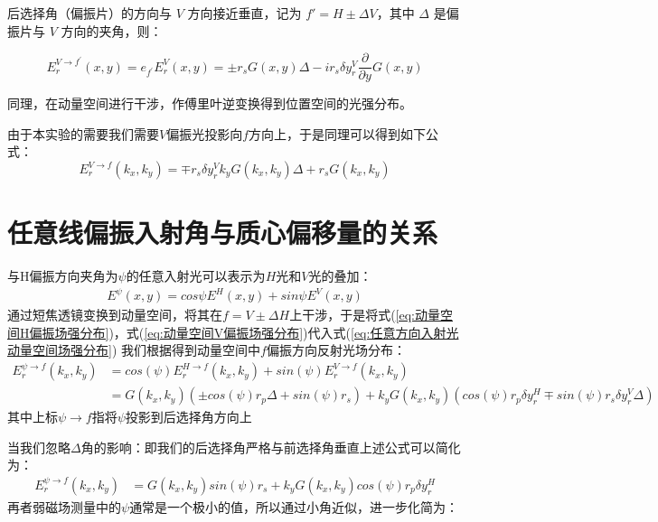 \documentclass[12pt]{ctexart}
\numberwithin{equation}{section} %
\begin{document}
      
        后选择角（偏振片）的方向与 $V$ 方向接近垂直，记为 $f' = H \pm \Delta V$，其中 $\Delta$ 是偏振片与 $V$ 方向的夹角，则：

        \begin{equation*}
        E_{r}^{V \to f^{'}}(x,y) = e_{f^{'}} E_{r}^{V}(x,y) = \pm r_{s} G(x,y) \Delta -i r_{s} \delta y_{r}^{V} \frac{\partial}{\partial y} G(x,y)  
        \end{equation*}
        
        同理，在动量空间进行干涉，作傅里叶逆变换得到位置空间的光强分布。

        由于本实验的需要我们需要$V$偏振光投影向$f$方向上，于是同理可以得到如下公式：
\begin{equation}
    E_{r}^{V \to f}(k_x,k_y)=\mp r_{s} \delta y_{r}^{V}  k_y G\left(k_x, k_y\right)\Delta+r_sG(k_x,k_y)
\label{eq:动量空间V偏振场强分布}
\end{equation}

\section{任意线偏振入射角与质心偏移量的关系}
与H偏振方向夹角为$\psi$的任意入射光可以表示为$H$光和$V$光的叠加：
\begin{align*}E^{\psi}(x,y)=cos\psi E^H(x,y)+sin\psi E^V(x,y)\end{align*}
通过短焦透镜变换到动量空间，将其在$f=V \pm \Delta H $上干涉，于是将式(\ref{eq:动量空间H偏振场强分布})，式(\ref{eq:动量空间V偏振场强分布})代入式(\ref{eq:任意方向入射光动量空间场强分布})
我们根据得到动量空间中$f$偏振方向反射光场分布：
\begin{align}
    E_r^{\psi \to f}(k_x,k_y) &=cos(\psi)E_r^{H \to f}(k_x,k_y)+sin(\psi)E_r^{V \to f }(k_x,k_y) \\
    &=G(k_x,k_y)(\pm cos(\psi) r_p \Delta+sin(\psi)r_s)+k_yG(k_x,k_y)(cos(\psi)r_p\delta y_r^H \mp sin(\psi) r_s \delta y_r^V \Delta)
\label{eq:任意方向入射光动量空间场强分布}
\end{align}
其中上标$\psi \to f$指将$\psi$投影到后选择角方向上

当我们忽略$\Delta$角的影响：即我们的后选择角严格与前选择角垂直上述公式可以简化为：
\begin{align}
    E_r^{\psi \to f}(k_x,k_y) &=G(k_x,k_y)sin(\psi)r_s+k_yG(k_x,k_y)cos(\psi)r_p\delta y_r^H
\label{eq:任意方向入射光动量空间场强分布（简化版）}
\end{align}
再者弱磁场测量中的$\psi$通常是一个极小的值，所以通过小角近似，进一步化简为：
\end{document}
